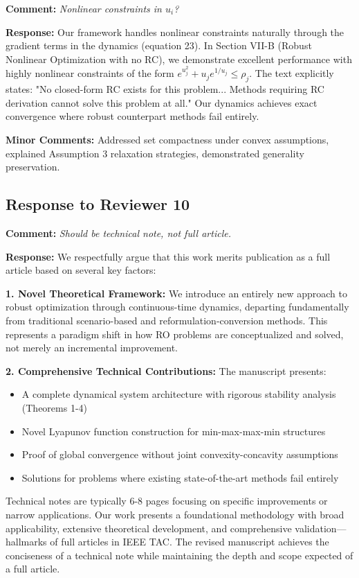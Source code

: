 \documentclass[journal,twoside,web]{ieeecolor}
\begin{document}
\textbf{Comment:} \textit{Nonlinear constraints in $u_i$?}

\textbf{Response:} Our framework handles nonlinear constraints naturally through the gradient terms in the dynamics (equation 23). In Section VII-B (Robust Nonlinear Optimization with no RC), we demonstrate excellent performance with highly nonlinear constraints of the form $e^{u_j^2}+u_j e^{1/u_j} \leq \rho_j$. The text explicitly states: "No closed-form RC exists for this problem... Methods requiring RC derivation cannot solve this problem at all." Our dynamics achieves exact convergence where robust counterpart methods fail entirely.

\textbf{Minor Comments:} Addressed set compactness under convex assumptions, explained Assumption 3 relaxation strategies, demonstrated generality preservation.

\subsection*{Response to Reviewer 10}

\textbf{Comment:} \textit{Should be technical note, not full article.}

\textbf{Response:} We respectfully argue that this work merits publication as a full article based on several key factors:

\textbf{1. Novel Theoretical Framework:} We introduce an entirely new approach to robust optimization through continuous-time dynamics, departing fundamentally from traditional scenario-based and reformulation-conversion methods. This represents a paradigm shift in how RO problems are conceptualized and solved, not merely an incremental improvement.

\textbf{2. Comprehensive Technical Contributions:} The manuscript presents:
\begin{itemize}
\item A complete dynamical system architecture with rigorous stability analysis (Theorems 1-4)
\item Novel Lyapunov function construction for min-max-max-min structures
\item Proof of global convergence without joint convexity-concavity assumptions
\item Solutions for problems where existing state-of-the-art methods fail entirely
\end{itemize}

Technical notes are typically 6-8 pages focusing on specific improvements or narrow applications. Our work presents a foundational methodology with broad applicability, extensive theoretical development, and comprehensive validation—hallmarks of full articles in IEEE TAC. The revised manuscript achieves the conciseness of a technical note while maintaining the depth and scope expected of a full article.
\end{document}
